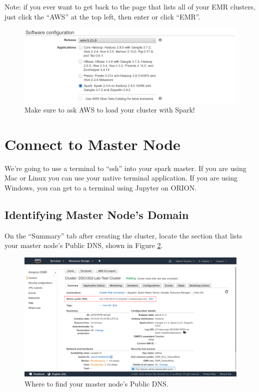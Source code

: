 \documentclass[11pt]{article}
\renewcommand\:{\colon} %
\begin{document}
Note: if you ever want to get back to the page that lists all of your EMR
clusters, just click the ``AWS'' at the top left, then enter or click ``EMR''.

\begin{figure}
  \centering
  \includegraphics[width=0.8\linewidth]{./figs/aws-emr-spark.png}
  \caption{Make sure to ask AWS to load your cluster with Spark!}
  \label{fig:aws-emr-spark}
\end{figure}


\section{Connect to Master Node}

We're going to use a terminal to ``ssh'' into your spark master.  If you are 
using Mac or Linux you can use your native terminal application.  If you are
using Windows, you can get to a terminal using Jupyter on ORION.

\subsection{Identifying Master Node's Domain}

On the ``Summary'' tab after creating the cluster, locate the section that 
lists your master node's Public DNS, shown in Figure \ref{fig:aws-master-dns}.

\begin{figure}[htpb]
  \centering
  \includegraphics[width=0.8\linewidth]{./figs/aws-emr-dns.pdf}
  \caption{Where to find your master node's Public DNS.}
  \label{fig:aws-master-dns}
\end{figure}
\end{document}
